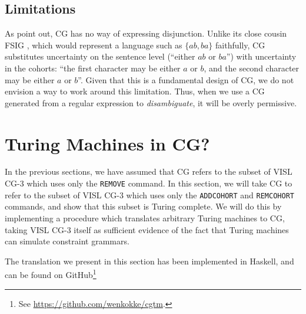 \documentclass[11pt]{article}
\def\t#1{\texttt{#1}}
\begin{document}
\subsection{Limitations}
As  point out, CG has no way of expressing disjunction.
Unlike its close cousin FSIG \cite{koskenniemi90}, which would represent a 
language such as $\{ab,ba\}$ faithfully, CG substitutes uncertainty on the 
sentence level (``either $ab$ or $ba$'') with uncertainty in the cohorts: 
``the first character may be either $a$ or $b$, and the second character 
may be either $a$ or $b$''.
Given that this is a fundamental design of CG, we do not envision a way to work
around this limitation. Thus, when we use a CG generated from a regular
expression to \emph{disambiguate}, it will be overly permissive.


\section{Turing Machines in CG?}\label{sec:turingcomplete}
In the previous sections, we have assumed that CG refers to the subset of VISL
CG-3 which uses only the \t{REMOVE} command. In this section, we will take CG to
refer to the subset of VISL CG-3 which uses only the \t{ADDCOHORT} and
\t{REMCOHORT} commands, and show that this subset is Turing complete.
We will do this by implementing a procedure which translates arbitrary Turing
machines to CG, taking VISL CG-3 itself as sufficient evidence of the fact that
Turing machines can simulate constraint grammars.

The translation we present in this section has been implemented in Haskell, and
can be found on GitHub\footnote{%
  See \url{https://github.com/wenkokke/cgtm}.
}
\end{document}
